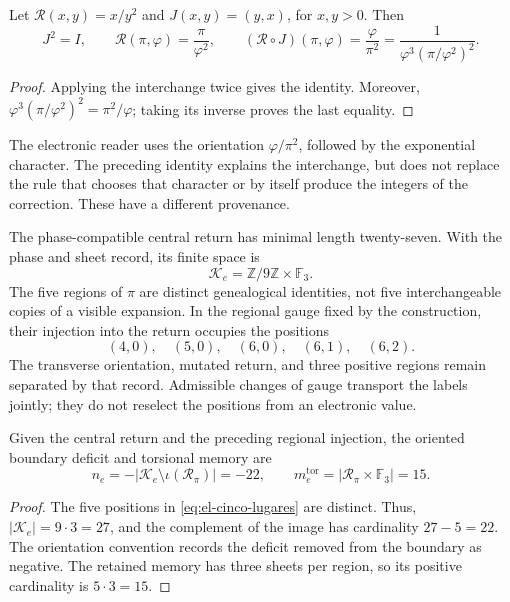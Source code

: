 \begin{lemma}
Let \(\mathcal R(x,y)=x/y^2\) and \(J(x,y)=(y,x)\), for \(x,y>0\).
Then
\begin{equation}
 J^2=I,\qquad
 \mathcal R(\pi,\varphi)=\frac{\pi}{\varphi^2},\qquad
 (\mathcal R\circ J)(\pi,\varphi)=\frac{\varphi}{\pi^2}
 =\frac1{\varphi^3(\pi/\varphi^2)^2}.
 \label{eq:el-bisagra}
\end{equation}
\end{lemma}
\begin{proof}
Applying the interchange twice gives the identity. Moreover,
\(\varphi^3(\pi/\varphi^2)^2=\pi^2/\varphi\); taking its inverse proves
the last equality.
\end{proof}

The electronic reader uses the orientation \(\varphi/\pi^2\),
followed by the exponential character. The preceding identity explains the
interchange, but does not replace the rule that chooses that character or
by itself produce the integers of the correction. These have a different provenance.

The phase-compatible central return has minimal length
twenty-seven. With the phase and sheet record, its finite space is
\[
 \mathcal K_e=\mathbb Z/9\mathbb Z\times\mathbb F_3.
\]
The five regions of \(\pi\) are distinct genealogical identities,
not five interchangeable copies of a visible expansion. In the regional
gauge fixed by the construction, their injection into the return occupies
the positions
\begin{equation}
 (4,0),\quad(5,0),\quad(6,0),\quad(6,1),\quad(6,2).
 \label{eq:el-cinco-lugares}
\end{equation}
The transverse orientation, mutated return, and three positive
regions remain separated by that record. Admissible changes
of gauge transport the labels jointly; they do not reselect
the positions from an electronic value.

\begin{proposition}
Given the central return and the preceding regional injection, the oriented
boundary deficit and torsional memory are
\begin{equation}
 n_e=-|\mathcal K_e\setminus\iota(\mathscr R_\pi)|=-22,
 \qquad
 m_e^{\mathrm{tor}}=|\mathscr R_\pi\times\mathbb F_3|=15.
 \label{eq:el-selector-enteros}
\end{equation}
\end{proposition}
\begin{proof}
The five positions in \eqref{eq:el-cinco-lugares} are distinct.
Thus, \(|\mathcal K_e|=9\cdot3=27\), and the complement of the image
has cardinality \(27-5=22\). The orientation convention records
the deficit removed from the boundary as negative. The retained memory has
three sheets per region, so its positive cardinality is
\(5\cdot3=15\).
\end{proof}

